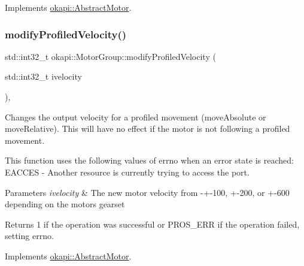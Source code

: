 Implements \mbox{\hyperlink{classokapi_1_1AbstractMotor_aa46c96a6eec7921ad5b12fcd4119358e}{okapi\+::\+Abstract\+Motor}}.

\mbox{\label{classokapi_1_1MotorGroup_a616f20db24f1eff4d3641b86faef4fbd}} 
\subsubsection{\texorpdfstring{modifyProfiledVelocity()}{modifyProfiledVelocity()}}
{\footnotesize\ttfamily std\+::int32\+\_\+t okapi\+::\+Motor\+Group\+::modify\+Profiled\+Velocity (\begin{DoxyParamCaption}\item[{std\+::int32\+\_\+t}]{ivelocity }\end{DoxyParamCaption})\hspace{0.3cm}{\ttfamily [override]}, {\ttfamily [virtual]}}

Changes the output velocity for a profiled movement (move\+Absolute or move\+Relative). This will have no effect if the motor is not following a profiled movement.

This function uses the following values of errno when an error state is reached\+: E\+A\+C\+C\+ES -\/ Another resource is currently trying to access the port.


\begin{DoxyParams}{Parameters}
{\em ivelocity} & The new motor velocity from -\/+-\/100, +-\/200, or +-\/600 depending on the motor\textquotesingle{}s gearset \\
\hline
\end{DoxyParams}
\begin{DoxyReturn}{Returns}
1 if the operation was successful or {\ttfamily P\+R\+O\+S\+\_\+\+E\+RR} if the operation failed, setting errno. 
\end{DoxyReturn}


Implements \mbox{\hyperlink{classokapi_1_1AbstractMotor_a1d131cbf0b8a325a54034e540c3be6d2}{okapi\+::\+Abstract\+Motor}}.

\mbox{\label{classokapi_1_1MotorGroup_afe6800639a995d37d8963c72fb8526d4}} 

